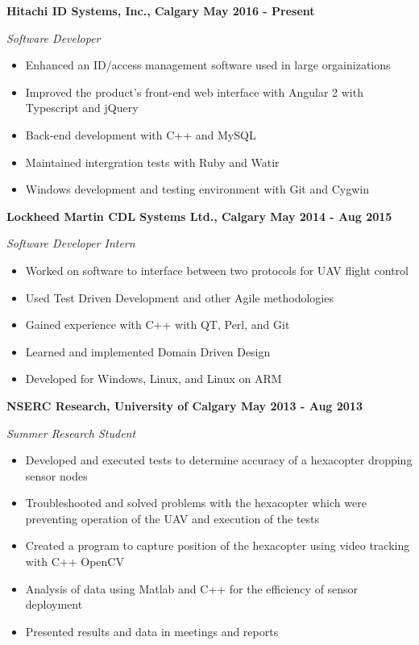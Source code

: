 \documentclass[12pt]{article}
\begin{document}
\bigskip
{}
\medskip

\noindent \centerline{ \bf Hitachi ID Systems, Inc., Calgary \hfill May 2016 - Present}
\indent \emph{ Software Developer }
\begin{itemize}
  \item Enhanced an ID/access management software used in large orgainizations
  \item Improved the product's front-end web interface with Angular 2 with Typescript and jQuery
  \item Back-end development with C++ and MySQL
  \item Maintained intergration tests with Ruby and Watir
  \item Windows development and testing environment with Git and Cygwin
\end{itemize}

\noindent \centerline{ \bf Lockheed Martin CDL Systems Ltd., Calgary \hfill May 2014 - Aug 2015}
\indent \emph{ Software Developer Intern }
\begin{itemize}
  \item Worked on software to interface between two protocols for UAV flight control
  \item Used Test Driven Development and other Agile methodologies
  \item Gained experience with C++ with QT, Perl, and Git
  \item Learned and implemented Domain Driven Design
  \item Developed for Windows, Linux, and Linux on ARM
\end{itemize}

\noindent \centerline{ \bf NSERC Research, University of Calgary \hfill May 2013 - Aug 2013}
\indent \emph{ Summer Research Student }
\begin{itemize}
  \item Developed and executed tests to determine accuracy of a hexacopter dropping sensor nodes
  \item Troubleshooted and solved problems with the hexacopter which were preventing operation of the UAV and execution of the tests
  \item Created a program to capture position of the hexacopter using video tracking with C++ OpenCV
  \item Analysis of data using Matlab and C++ for the efficiency of sensor deployment
  \item Presented results and data in meetings and reports
\end{itemize}
\end{document}
